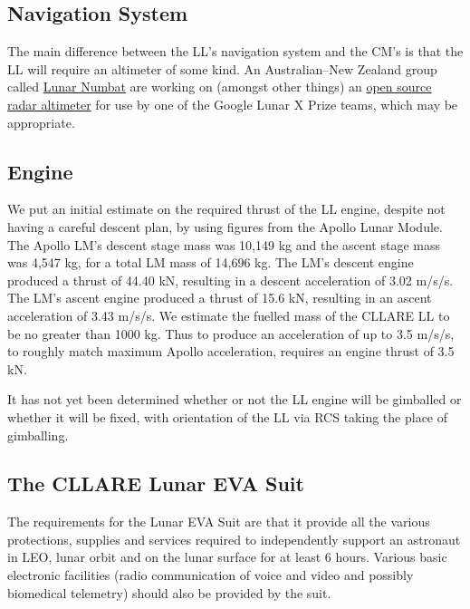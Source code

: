 \documentclass{report}
\begin{document}
\subsection{Navigation System}

The main difference between the LL's navigation system and the CM's is that the LL will require an altimeter of some kind.  An Australian--New Zealand group called \href{http://www.lunarnumbat.org}{Lunar Numbat} are working on (amongst other things) an \href{http://www.lunarnumbat.org/cgi-bin/twiki/view/LunarNumbat/LNTaskRadarAltimeter}{open source radar altimeter} for use by one of the Google Lunar X Prize teams, which may be appropriate.

\subsection{Engine} \label{sec:ll_engine}

We put an initial estimate on the required thrust of the LL engine, despite not having a careful descent plan, by using figures from the Apollo Lunar Module.  The Apollo LM's descent stage mass was 10,149 kg and the ascent stage mass was 4,547 kg, for a total LM mass of 14,696 kg.  The LM's descent engine produced a thrust of 44.40 kN, resulting in a descent acceleration of 3.02 m/s/s.  The LM's ascent engine produced a thrust of 15.6 kN, resulting in an ascent acceleration of 3.43 m/s/s.  We estimate the fuelled mass of the CLLARE LL to be no greater than 1000 kg.  Thus to produce an acceleration of up to 3.5 m/s/s, to roughly match maximum Apollo acceleration, requires an engine thrust of 3.5 kN. 

It has not yet been determined whether or not the LL engine will be gimballed or whether it will be fixed, with orientation of the LL via RCS taking the place of gimballing.

\subsection{The CLLARE Lunar EVA Suit}

The requirements for the Lunar EVA Suit are that it provide all the various protections, supplies and services required to independently support an astronaut in LEO, lunar orbit and on the lunar surface for at least 6 hours.  Various basic electronic facilities (radio communication of voice and video and possibly biomedical telemetry) should also be provided by the suit.
\end{document}
